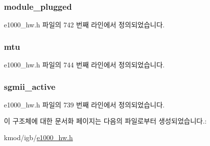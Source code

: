 \subsubsection[{\texorpdfstring{module\+\_\+plugged}{module_plugged}}]{ module\+\_\+plugged}\hypertarget{structe1000__dev__spec__82575_a9501b5464359b87554fc32729f1b2130}{}\label{structe1000__dev__spec__82575_a9501b5464359b87554fc32729f1b2130}


e1000\+\_\+hw.\+h 파일의 742 번째 라인에서 정의되었습니다.

\subsubsection[{\texorpdfstring{mtu}{mtu}}]{ mtu}\hypertarget{structe1000__dev__spec__82575_a6bf07cd0dd9e1459d63d3e38c4159bee}{}\label{structe1000__dev__spec__82575_a6bf07cd0dd9e1459d63d3e38c4159bee}


e1000\+\_\+hw.\+h 파일의 744 번째 라인에서 정의되었습니다.

\subsubsection[{\texorpdfstring{sgmii\+\_\+active}{sgmii_active}}]{ sgmii\+\_\+active}\hypertarget{structe1000__dev__spec__82575_a86c1ac5e1594ce33bdd6b8acc654a02b}{}\label{structe1000__dev__spec__82575_a86c1ac5e1594ce33bdd6b8acc654a02b}


e1000\+\_\+hw.\+h 파일의 739 번째 라인에서 정의되었습니다.



이 구조체에 대한 문서화 페이지는 다음의 파일로부터 생성되었습니다.\+:\begin{DoxyCompactItemize}
\item 
kmod/igb/\hyperlink{kmod_2igb_2e1000__hw_8h}{e1000\+\_\+hw.\+h}\end{DoxyCompactItemize}
